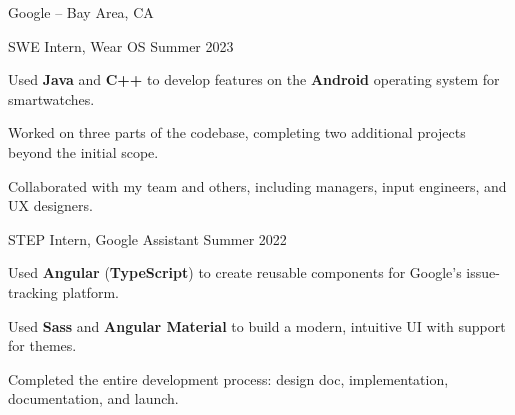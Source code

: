 \begin{entry}{Google -- Bay Area, CA}

	\entryItem
		{SWE Intern, Wear OS}
		{Summer 2023}
	
		\begin{items}
			\item Used \textbf{Java} and \textbf{C++} to develop features on the \textbf{Android} operating system for smartwatches.
			\item Worked on three parts of the codebase, completing two additional projects beyond the initial scope.
			\item Collaborated with my team and others, including managers, input engineers, and UX designers.
		\end{items}

	\entryItem
		{STEP Intern, Google Assistant}
		{Summer 2022}

		\begin{items}
			\item Used \textbf{Angular} (\textbf{TypeScript}) to create reusable components for Google's issue-tracking platform.
			\item Used \textbf{Sass} and \textbf{Angular Material} to build a modern, intuitive UI with support for themes.
			\item Completed the entire development process: design doc, implementation, documentation, and launch.
		\end{items}

\end{entry}
